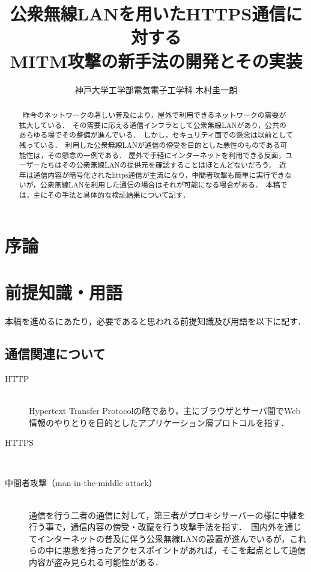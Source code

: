 \documentclass[dvipdfmx]{jsarticle}
\title{公衆無線LANを用いたHTTPS通信に対する\\MITM攻撃の新手法の開発とその実装}
\author{神戸大学工学部電気電子工学科 木村圭一朗}
\begin{document}
    \maketitle
    \begin{abstract}
        \ 昨今のネットワークの著しい普及により，屋外で利用できるネットワークの需要が拡大している．\
        その需要に応える通信インフラとして公衆無線LANがあり，公共のあらゆる場でその整備が進んでいる．\
        しかし，セキュリティ面での懸念は以前として残っている．\
        利用した公衆無線LANが通信の傍受を目的とした悪性のものである可能性は，その懸念の一例である．
        屋外で手軽にインターネットを利用できる反面，ユーザーたちはその公衆無線LANの提供元を確認することはほとんどないだろう．\
        近年は通信内容が暗号化されたhttps通信が主流になり，中間者攻撃も簡単に実行できないが，公衆無線LANを利用した通信の場合はそれが可能になる場合がある．\
        本稿では，主にその手法と具体的な検証結果について記す．
        \newline
    \end{abstract}
    \tableofcontents
    \clearpage
    \section{序論}

    \section{前提知識・用語}
        本稿を進めるにあたり，必要であると思われる前提知識及び用語を以下に記す．
        \subsection{通信関連について}
            \begin{description}
                \item[HTTP]\mbox{}\\
                    Hypertext Transfer Protocolの略であり，主にブラウザとサーバ間でWeb情報のやりとりを目的としたアプリケーション層プロトコルを指す．\
                \item[HTTPS]\mbox{}\\ 
                \item[中間者攻撃（man-in-the-middle attack）]\mbox{}\\ 
                    通信を行う二者の通信に対して，第三者がプロキシサーバーの様に中継を行う事で，通信内容の傍受・改竄を行う攻撃手法を指す．\
                    国内外を通じてインターネットの普及に伴う公衆無線LANの設置が進んでいるが，これらの中に悪意を持ったアクセスポイントがあれば，そこを起点として通信内容が盗み見られる可能性がある．
            \end{description}
\end{document}
